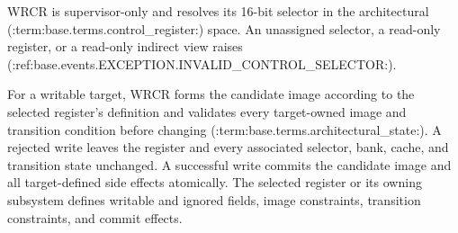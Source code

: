 WRCR is supervisor-only and resolves its 16-bit selector in the architectural (:term:base.terms.control_register:) space. An unassigned
selector, a read-only register, or a read-only indirect view raises (:ref:base.events.EXCEPTION.INVALID_CONTROL_SELECTOR:).

For a writable target, WRCR forms the candidate image according to the selected register's definition and validates every target-owned
image and transition condition before changing (:term:base.terms.architectural_state:). A rejected write leaves the register and every associated
selector, bank, cache, and transition state unchanged. A successful write commits the candidate image and all target-defined side effects
atomically. The selected register or its owning subsystem defines writable and ignored fields, image constraints, transition constraints,
and commit effects.
